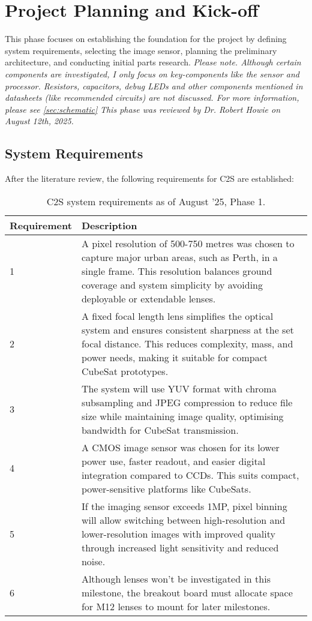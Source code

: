 \documentclass[10pt]{article}
\newcommand{\nl}{\newline \newline}
\begin{document}
\newpage \section{Project Planning and Kick-off} \label{sec:start}
This phase focuses on establishing the foundation for the project by defining system requirements, selecting the image sensor, planning the preliminary architecture, and conducting initial parts research.
\nl
\textit{Please note. Although certain components are investigated, I only focus on key-components like the sensor and processor. Resistors, capacitors, debug LEDs and other components mentioned in datasheets (like recommended circuits) are not discussed. For more information, please see \autoref{sec:schematic}}
\nl
\textit{This phase was reviewed by Dr. Robert Howie on August 12th, 2025.}

\subsection{System Requirements}
After the literature review, the following requirements for C2S are established:

\begin{table}[H]
\centering
\begin{tabular}{|p{2cm}|p{12cm}|}
\hline
\textbf{Requirement} & \textbf{Description} \\
\hline
1 & A pixel resolution of 500-750 metres was chosen to capture major urban areas, such as Perth, in a single frame. This resolution balances ground coverage and system simplicity by avoiding deployable or extendable lenses. \\
\hline
2 & A fixed focal length lens simplifies the optical system and ensures consistent sharpness at the set focal distance. This reduces complexity, mass, and power needs, making it suitable for compact CubeSat prototypes. \\
\hline
3 & The system will use YUV format with chroma subsampling and JPEG compression to reduce file size while maintaining image quality, optimising bandwidth for CubeSat transmission. \\
\hline
4 & A CMOS image sensor was chosen for its lower power use, faster readout, and easier digital integration compared to CCDs. This suits compact, power-sensitive platforms like CubeSats. \\
\hline
5 & If the imaging sensor exceeds 1MP, pixel binning will allow switching between high-resolution and lower-resolution images with improved quality through increased light sensitivity and reduced noise. \\
\hline
6 & Although lenses won't be investigated in this milestone, the breakout board must allocate space for M12 lenses to mount for later milestones. \\
\hline
\end{tabular}
\caption{C2S system requirements as of August '25, Phase 1.}
\end{table}
\end{document}
